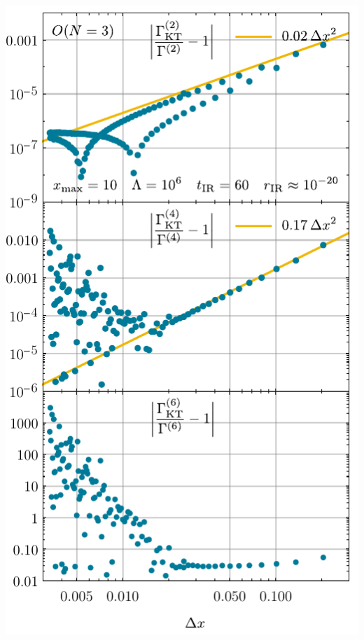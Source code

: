 	{\fullWidthTwoColumnFigureSpacing}
	{%
		\vspace{.065cm}\includegraphics[width=\subcaptionFigureWidth+0.2cm]{0d/figures/sc_i_on_3_xmax_10_lambda_1e6_tir_60_deltax_scaling.pdf} %
		\captionsetup{width=\subcaptionFigureWidth}%
		\caption{%
			The relative error of the numerical results (blue dots) from the \kt{} scheme for the \ipi{} \nptFunctions{} $\Gamma^{(2n)}$ for $n = 1, 2, 3$ as a function of $\Delta x$ with \ic{} \eqref{eq:testing_scenario_non-analytic_quadaratic_asymptote}.
			The numerical derivatives at $\sigma = 0$ of $u(t_\mathrm{IR}=60, \sigma)$ were calculated via the second-order accurate central schemes \eqref{eq:derivative_1_central_error_2}, \eqref{eq:derivative_3_central_error_2}, and \eqref{eq:derivative_5_central_error_2}.
			The plot was produced with $x_\mathrm{max} = 10$, but could have been calculated for any sufficiently large $x_\mathrm{max}$.
			We used the exponential regulator~\eqref{eq:exponential_regulator} with \uv{} scale $\Lambda = 10^6$.
			The yellow straight lines $\propto \Delta x^2$ are for optical guidance.
		}%
		\label{fig:sc_i_on_3_xmax_10_lambda_1e6_tir_60_deltax_scaling}
		\vspace{1cm}
	}%

